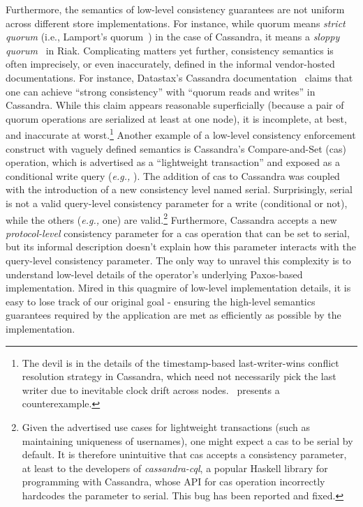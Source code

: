 Furthermore, the semantics of low-level consistency guarantees are not
uniform across different store implementations. For instance, while
{\sc quorum} means \emph{strict quorum} (i.e., Lamport's
quorum~\cite{LamportQuorum}) in the case of Cassandra, it means a
\emph{sloppy quorum}~\cite{Dynamo} in Riak. Complicating matters yet
further, consistency semantics is often imprecisely, or even
inaccurately, defined in the informal vendor-hosted documentations.
For instance, Datastax's Cassandra documentation~\cite{dxlwt} claims
that one can achieve ``strong consistency'' with ``quorum reads and
writes'' in Cassandra.  While this claim appears reasonable
superficially (because a pair of quorum operations are serialized at
least at one node), it is incomplete, at best, and inaccurate at
worst.\footnote{The devil is in the details of the timestamp-based
  last-writer-wins conflict resolution strategy in Cassandra, which
  need not necessarily pick the last writer due to inevitable clock
  drift across nodes.~\cite{JepsenCassandra}
  presents a counterexample.}  Another example
of a low-level consistency enforcement construct with vaguely defined
semantics is Cassandra's Compare-and-Set ({\sc cas}) operation, which
is advertised as a ``lightweight transaction'' and exposed as a
conditional write query (\emph{e.g.,} ).  The addition of {\sc cas} to Cassandra was coupled with
the introduction of a new consistency level named {\sc serial}.
Surprisingly, {\sc serial} is not a valid query-level consistency
parameter for a write (conditional or not), while the others
(\emph{e.g.,} {\sc one}) are valid.\footnote{Given the advertised use
  cases for lightweight transactions (such as maintaining uniqueness
  of usernames), one might expect a {\sc cas} to be {\sc serial} by
  default. It is therefore unintuitive that {\sc cas} accepts a
  consistency parameter, at least to the developers of
  \emph{cassandra-cql}, a popular Haskell library for programming with
  Cassandra, whose API for {\sc cas} operation incorrectly hardcodes
  the parameter to {\sc serial}. This bug has been reported and
  fixed.}  Furthermore,
Cassandra accepts a new \emph{protocol-level} consistency parameter
for a {\sc cas} operation that can be set to {\sc serial}, but its
informal description doesn't explain how this parameter interacts with
the query-level consistency parameter.  The only way to unravel this
complexity is to understand low-level details of the operator's
underlying Paxos-based implementation.  Mired in this quagmire of
low-level implementation details, it is easy to lose track of our
original goal - ensuring the high-level semantics guarantees required
by the application are met as efficiently as possible by the
implementation.

